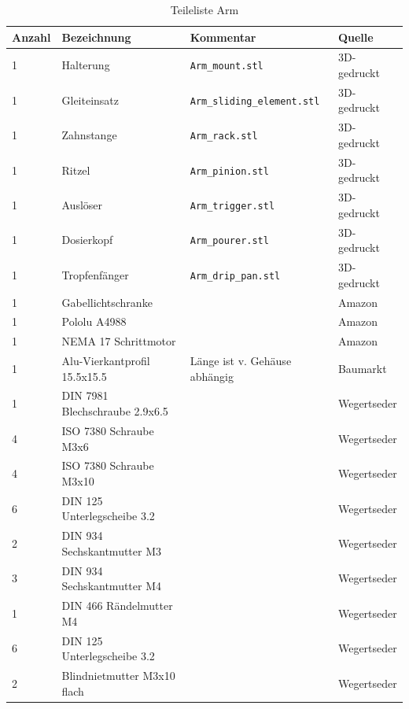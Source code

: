 \documentclass[a4paper]{scrartcl}
\begin{document}
\begin{table}
\caption{Teileliste Arm}
\begin{tabular}{|l|l|l|l|}
\hline
Anzahl & Bezeichnung & Kommentar & Quelle\\
\hline
1 & Halterung & \texttt{Arm\_mount.stl} & 3D-gedruckt\\
\hline
1 & Gleiteinsatz & \texttt{Arm\_sliding\_element.stl} & 3D-gedruckt\\
\hline
1 & Zahnstange & \texttt{Arm\_rack.stl}  & 3D-gedruckt\\
\hline
1 & Ritzel & \texttt{Arm\_pinion.stl}  & 3D-gedruckt\\
\hline
1 & Auslöser & \texttt{Arm\_trigger.stl} & 3D-gedruckt\\
\hline
1 & Dosierkopf & \texttt{Arm\_pourer.stl} & 3D-gedruckt\\
\hline
1 & Tropfenfänger & \texttt{Arm\_drip\_pan.stl}  & 3D-gedruckt\\
\hline
1 & Gabellichtschranke &  & Amazon\\
\hline 
1 & Pololu A4988 & & Amazon\\
\hline 
1 & NEMA 17 Schrittmotor & & Amazon\\
\hline
1 & Alu-Vierkantprofil 15.5x15.5 & Länge ist v. Gehäuse abhängig& Baumarkt\\
\hline
1& DIN 7981 Blechschraube 2.9x6.5  & & Wegertseder\\
\hline
4 & ISO 7380 Schraube M3x6  & & Wegertseder\\
\hline
4 & ISO 7380 Schraube M3x10  & & Wegertseder\\
\hline
6 & DIN 125 Unterlegscheibe 3.2  & & Wegertseder\\
\hline
2 & DIN 934 Sechskantmutter M3 & & Wegertseder\\
\hline
3 & DIN 934 Sechskantmutter M4 & & Wegertseder\\
\hline
1 & DIN 466 Rändelmutter M4 &  & Wegertseder\\
\hline 
6 & DIN 125 Unterlegscheibe 3.2  & & Wegertseder\\
\hline
2 & Blindnietmutter M3x10 flach & & Wegertseder\\
\hline 

\end{tabular}
\end{table}
\end{document}
